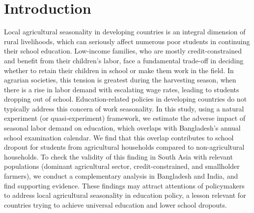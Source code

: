 \documentclass[12pt,letterpaper]{article}
\newcommand{\0}{\ensuremath{\mbox{\boldmath $0$}}}
\begin{document}
\doublespacing

\pagebreak

\normalsize





\section{Introduction}


Local agricultural seasonality in developing countries is an integral dimension of rural livelihoods, which can seriously affect numerous poor students in continuing their school education. Low-income families, who are mostly credit-constrained and benefit from their children's labor, face a fundamental trade-off in deciding whether to retain their children in school or make them work in the field. In agrarian societies, this tension is greatest during the harvesting season, when there is a rise in labor demand with escalating wage rates, leading to students dropping out of school. Education-related policies in developing countries do not typically address this concern of work seasonality. In this study, using a natural experiment (or quasi-experiment) framework, we estimate the adverse impact of seasonal labor demand on education, which overlaps with Bangladesh's annual school examination calendar. We find that this overlap contributes to school dropout for students from agricultural households compared to non-agricultural households. To check the validity of this finding in South Asia with relevant populations (dominant agricultural sector, credit-constrained, and smallholder farmers), we conduct a complementary analysis in Bangladesh and India, and find supporting evidence. These findings may attract attentions of policymakers to address local agricultural seasonality in education policy, a lesson relevant for countries trying to achieve universal education and lower school dropouts.
\end{document}
